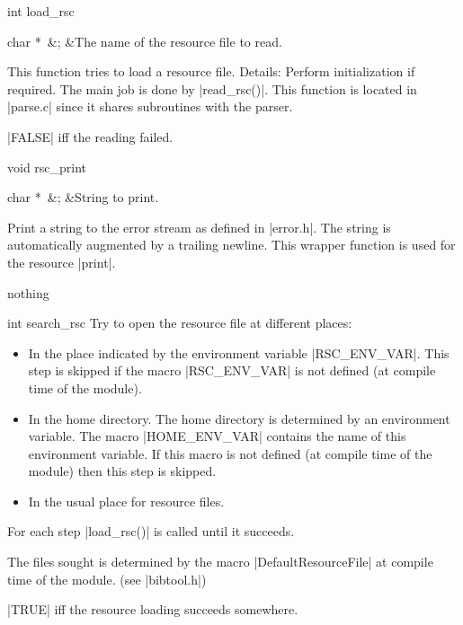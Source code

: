 \begin{Function}{int }{load\_rsc}
  \begin{Arguments}
    char *\ 	&;	&The name of the resource file to read.
  \end{Arguments}%
  This function tries to load a resource file. 
  Details:
  Perform initialization if required.
  The main job is done by |read_rsc()|. This function is located
  in |parse.c| since it shares subroutines with the parser.
  \begin{Result}
    |FALSE| iff the reading failed.
  \end{Result}
\end{Function}
\begin{Function}{void }{rsc\_print}
  \begin{Arguments}
    char *\ 	&;	&String to print.
  \end{Arguments}%
  Print a string to the error stream as defined in
  |error.h|. The string is automatically augmented by a
  trailing newline.
  This wrapper function is used for the resource |print|.
  \begin{Result}
    nothing
  \end{Result}
\end{Function}
\begin{Function}{int }{search\_rsc}  Try to open the resource file at different places:
  \begin{itemize}
  \item In the place indicated by the environment variable
  |RSC_ENV_VAR|. This step is skipped if the macro
  |RSC_ENV_VAR| is not defined (at compile time of the
  module).
  \item In the home directory.  The home directory is
  determined by an environment variable.  The macro
  |HOME_ENV_VAR| contains the name of this environment
  variable. If this macro is not defined (at
  compile time of the module) then this step is skipped.
  \item In the usual place for resource files.
  \end{itemize}
  For each step |load_rsc()| is called until it
  succeeds.
  
  The files sought is determined by the macro
  |DefaultResourceFile| at compile time of the
  module. (see |bibtool.h|)
  \begin{Result}
    |TRUE| iff the resource loading succeeds somewhere.
  \end{Result}
\end{Function}

